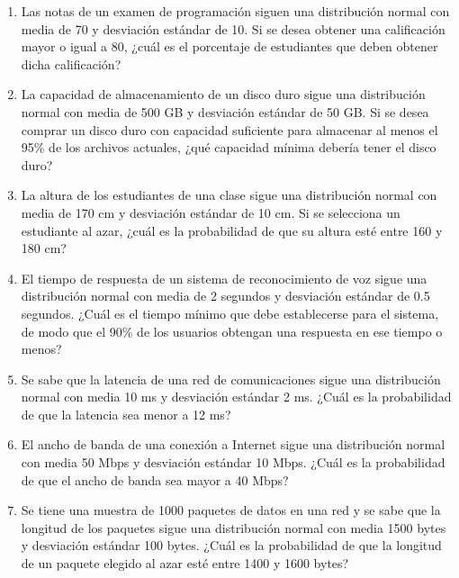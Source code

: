 \begin{Ejer}
\begin{enumerate}
    \item Las notas de un examen de programación siguen una distribución normal con media de 70 y desviación estándar de 10. Si se desea obtener una calificación mayor o igual a 80, ¿cuál es el porcentaje de estudiantes que deben obtener dicha calificación?

    \item La capacidad de almacenamiento de un disco duro sigue una distribución normal con media de 500 GB y desviación estándar de 50 GB. Si se desea comprar un disco duro con capacidad suficiente para almacenar al menos el 95\% de los archivos actuales, ¿qué capacidad mínima debería tener el disco duro?

    \item La altura de los estudiantes de una clase sigue una distribución normal con media de 170 cm y desviación estándar de 10 cm. Si se selecciona un estudiante al azar, ¿cuál es la probabilidad de que su altura esté entre 160 y 180 cm?

    \item El tiempo de respuesta de un sistema de reconocimiento de voz sigue una distribución normal con media de 2 segundos y desviación estándar de 0.5 segundos. ¿Cuál es el tiempo mínimo que debe establecerse para el sistema, de modo que el 90\% de los usuarios obtengan una respuesta en ese tiempo o menos?

    \item Se sabe que la latencia de una red de comunicaciones sigue una distribución normal con media 10 ms y desviación estándar 2 ms. ¿Cuál es la probabilidad de que la latencia sea menor a 12 ms?

    \item El ancho de banda de una conexión a Internet sigue una distribución normal con media 50 Mbps y desviación estándar 10 Mbps. ¿Cuál es la probabilidad de que el ancho de banda sea mayor a 40 Mbps?

    \item Se tiene una muestra de 1000 paquetes de datos en una red y se sabe que la longitud de los paquetes sigue una distribución normal con media 1500 bytes y desviación estándar 100 bytes. ¿Cuál es la probabilidad de que la longitud de un paquete elegido al azar esté entre 1400 y 1600 bytes?


\end{enumerate}
\end{Ejer} 


